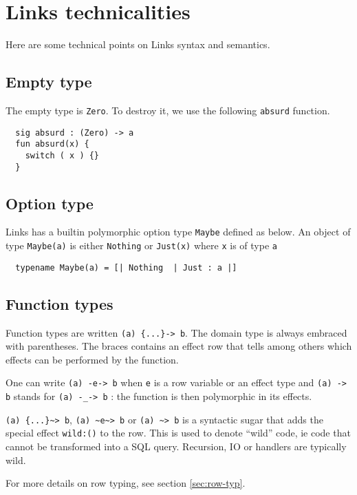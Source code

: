 \documentclass[nonacm=true, language=french, language=english]{acmart}
\begin{document}




\appendix

\section{Links technicalities}
\label{sec:tech}

Here are some technical points on Links syntax and semantics.

\subsection{Empty type}
\label{sec:tech:zero}
The empty type is \verb|Zero|. To destroy it, we use the following \verb|absurd| function.
\begin{lstlisting}
  sig absurd : (Zero) -> a
  fun absurd(x) {
    switch ( x ) {}
  }
\end{lstlisting}

\subsection{Option type}
\label{sec:tech:maybe}
Links has a builtin polymorphic option type \verb|Maybe| defined as below. An object of type \verb|Maybe(a)| is either \verb|Nothing| or \verb|Just(x)| where \verb|x| is of type \verb'a'
\begin{lstlisting}
  typename Maybe(a) = [| Nothing  | Just : a |]
\end{lstlisting}

\subsection{Function types}
Function types are written \verb|(a) {...}-> b|. The domain type is always embraced with parentheses. The braces contains an effect row that tells among others which effects can be performed by the function.

One can write \verb|(a) -e-> b| when \verb|e| is a row variable or an effect type and \verb|(a) -> b| stands for \verb|(a) -_-> b| : the function is then polymorphic in its effects.

\verb|(a) {...}~> b|, \verb|(a) ~e~> b| or \verb|(a) ~> b| is a syntactic sugar that adds the special effect \verb|wild:()| to the row. This is used to denote ``wild'' code, ie code that cannot be transformed into a SQL query. Recursion, IO or handlers are typically wild. \cite{}

For more details on row typing, see section \ref{sec:row-typ}.
\end{document}
